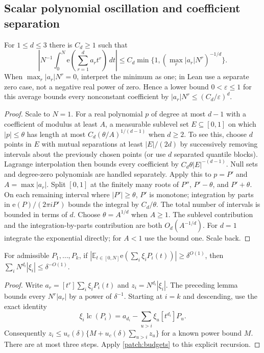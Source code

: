 \documentclass[11pt]{article}
\theoremstyle{definition}
\newcommand{\ee}[1]{\mathrm e\!\left(#1\right)}
\begin{document}
\subsection{Scalar polynomial oscillation and coefficient separation}
\begin{lemma}\label{lem:real-polynomial-oscillation}
For $1\leq d\leq3$ there is $C_d\geq1$ such that
\[
 \left|N^{-1}\int_0^N\ee{\sum_{r=1}^d a_rt^r}\,dt\right|
 \leq C_d\min\{1,(\max_r|a_r|N^r)^{-1/d}\}.
\]
When $\max_r|a_r|N^r=0$, interpret the minimum as one; in Lean use a separate zero case,
not a negative real power of zero.  Hence a lower bound $0<\varepsilon\leq1$ for this average bounds every nonconstant coefficient
by $|a_r|N^r\leq (C_d/\varepsilon)^d$.
\end{lemma}
\begin{proof}
Scale to $N=1$.  For a real polynomial $p$ of degree at most $d-1$ with a coefficient of
modulus at least $A$, a measurable sublevel set $E\subseteq[0,1]$ on which $|p|\leq\theta$
has length at most $C_d(\theta/A)^{1/(d-1)}$ when $d\geq2$.
To see this, choose $d$ points in $E$ with mutual separations at least $|E|/(2d)$ by successively
removing intervals about the previously chosen points (or use $d$ separated quantile blocks).
Lagrange interpolation then bounds every coefficient by $C_d\theta|E|^{-(d-1)}$.
Null sets and degree-zero polynomials are handled separately.
Apply this to $p=P'$ and $A=\max|a_r|$.  Split $[0,1]$ at the finitely many roots of
$P''$, $P'-\theta$, and $P'+\theta$.  On each remaining interval where $|P'|\geq\theta$,
$P'$ is monotone; integration by parts in $\ee{P}/(2\pi iP')$ bounds the integral by
$C_d/\theta$.  The total number of intervals is bounded in terms of $d$.
Choose $\theta=A^{1/d}$ when $A\geq1$.  The sublevel contribution and the integration-by-parts
contribution are both $O_d(A^{-1/d})$.  For $d=1$ integrate the exponential directly;
for $A<1$ use the bound one.  Scale back.
\end{proof}

\begin{lemma}\label{patch:triangular}
For admissible $P_1,\ldots,P_k$, if
$|\mathbb E_{t\in[0,N]}\ee{\sum_i\xi_iP_i(t)}|\geq\delta^{O(1)}$, then
$\sum_iN^{d_i}|\xi_i|\leq\delta^{-O(1)}$.
\end{lemma}
\begin{proof}
Write $a_r=[t^r]\sum_i\xi_iP_i(t)$ and $z_i=N^{d_i}|\xi_i|$.
The preceding lemma bounds every $N^r|a_r|$ by a power of $\delta^{-1}$.
Starting at $i=k$ and descending, use the exact identity
\[
 \xi_i\operatorname{lc}(P_i)=a_{d_i}-\sum_{u>i}\xi_u[t^{d_i}]P_u.
\]
Consequently $z_i\leq u_c(\delta)\{M+u_c(\delta)\sum_{u>i}z_u\}$ for a known power bound $M$.
There are at most three steps.  Apply \cref{patch:budgets} to this explicit recursion.
\end{proof}
\end{document}
